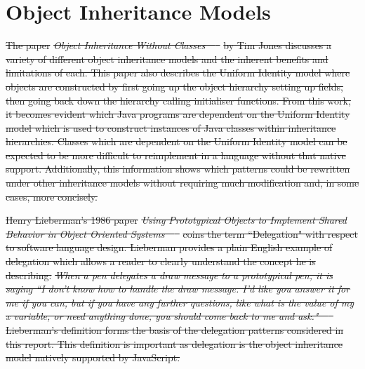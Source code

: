 \documentclass[11pt
              , a4paper
              , twoside
              , openright
              ]{report}
\providecommand{\DIFdel}[1]{{\protect\color{red}\sout{#1}}}                      %
\providecommand{\DIFdelbegin}{} %
\begin{document}
\section{Object Inheritance Models}
\DIFdelbegin \DIFdel{The paper }\textit{\DIFdel{Object Inheritance Without Classes~\mbox{%
\cite{InheritanceWithoutClasses}
}%
}} %
\DIFdel{by Tim Jones discusses a variety of different object inheritance models and the inherent benefits and limitations of each. This paper also describes the Uniform Identity model where objects are constructed by first going up the object hierarchy setting up fields, then going back down the hierarchy calling initialiser functions. From this work, it becomes evident which Java programs are dependent on the Uniform Identity model which is used to construct instances of Java classes within inheritance hierarchies. Classes which are dependent on the Uniform Identity model can be expected to be more difficult to reimplement in a language without that native support. Additionally, this information shows which patterns could be rewritten under other inheritance models without requiring much modification and, in some cases, more concisely.
}%

\DIFdel{Henry Lieberman's 1986 paper }\textit{\DIFdel{Using Prototypical Objects to Implement Shared Behavior in Object Oriented Systems~\mbox{%
\cite{UsingPrototypicalObjects}
}%
}} %
\DIFdel{coins the term ``Delegation" with respect to software language design. Lieberman provides a plain English example of delegation which allows a reader to clearly understand the concept he is describing:
}%
\textit{\DIFdel{
	When a pen delegates a draw message to a prototypical pen, it is saying ``I don't know how to handle the draw message. I'd like you answer it for me if you can, but if you have any further questions, like what is the value of my x variable, or need anything done, you should come back to me and ask."~\mbox{%
\cite{UsingPrototypicalObjects}
}%
}}
\DIFdel{Lieberman's definition forms the basis of the delegation patterns considered in this report. This definition is important as delegation is the object inheritance model natively supported by JavaScript.
}%
\end{document}
